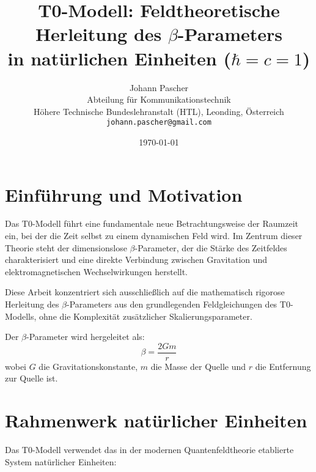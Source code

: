 \documentclass[12pt,a4paper]{article}
\begin{document}
	
	\title{T0-Modell: Feldtheoretische Herleitung des $\beta$-Parameters \\
		in natürlichen Einheiten ($\hbar = c = 1$)}
	\author{Johann Pascher\\
		Abteilung für Kommunikationstechnik\\
		Höhere Technische Bundeslehranstalt (HTL), Leonding, Österreich\\
		\texttt{johann.pascher@gmail.com}}
	\date{\today}
	
	\maketitle
	\tableofcontents
	\newpage
	
	\section{Einführung und Motivation}
	\label{sec:introduction}
	
	Das T0-Modell führt eine fundamentale neue Betrachtungsweise der Raumzeit ein, bei der die Zeit selbst zu einem dynamischen Feld wird. Im Zentrum dieser Theorie steht der dimensionslose $\beta$-Parameter, der die Stärke des Zeitfeldes charakterisiert und eine direkte Verbindung zwischen Gravitation und elektromagnetischen Wechselwirkungen herstellt.
	
	Diese Arbeit konzentriert sich ausschließlich auf die mathematisch rigorose Herleitung des $\beta$-Parameters aus den grundlegenden Feldgleichungen des T0-Modells, ohne die Komplexität zusätzlicher Skalierungsparameter.
	
	\begin{tcolorbox}[colback=blue!5!white,colframe=blue!75!black,title=Zentrales Ergebnis]
		Der $\beta$-Parameter wird hergeleitet als:
		\begin{equation}
			\boxed{\beta = \frac{2Gm}{r}}
		\end{equation}
		wobei $G$ die Gravitationskonstante, $m$ die Masse der Quelle und $r$ die Entfernung zur Quelle ist.
	\end{tcolorbox}
	
	\section{Rahmenwerk natürlicher Einheiten}
	\label{sec:natural_units}
	
	Das T0-Modell verwendet das in der modernen Quantenfeldtheorie \citep{peskin1995,weinberg1995} etablierte System natürlicher Einheiten:
	
\end{document}
